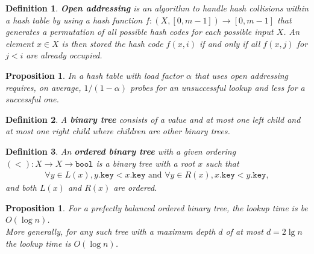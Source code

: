 \documentclass{article}
\theoremstyle{sltheorem}
\newtheorem{definition}{Definition}[section]
\newtheorem{proposition}[theorem]{Proposition}
\newcommand*\B[1]{\textbf{#1}}
\begin{document}
\begin{definition}
	\B{Open addressing} is an algorithm to handle hash collisions within a hash table 
	by using a hash function $f: (X, [0,m-1]) \to [0,m-1]$ that generates a permutation of all possible
	hash codes for each possible input $X$. An element $x\in X$ is then stored the hash code $f(x, i)$
	if and only if all $f(x,j)$ for $j < i$ are already occupied.
\end{definition}
\begin{proposition}
	In a hash table with load factor $\alpha$ that uses open addressing requires, on average, $1/(1-\alpha)$ 
	probes for an unsuccessful lookup and less for a successful one.
\end{proposition}
\begin{definition}
	A \B{binary tree} consists of a value and at most one left child and at most one right child where
	children are other binary trees.
\end{definition}
\begin{definition}
	An \B{ordered binary tree} with a given ordering $(<) : X \to X \to \texttt{bool}$ is a binary tree 
	with a root $x$ such that
	\begin{align*}
		\forall y \in L(x), y.\texttt{key} < x.\texttt{key} 
		\text{ and } \forall y \in R(x), x.\texttt{key} < y.\texttt{key},
	\end{align*}
	and both $L(x)$ and $R(x)$ are ordered.
\end{definition}
\begin{proposition}
	For a prefectly balanced ordered binary tree, the lookup time is be $O(\log n)$.\\
	More generally, for any such tree with a maximum depth $d$ of at most $d=2 \lg n$ the
	lookup time is $O(\log n)$.
\end{proposition}
\end{document}
